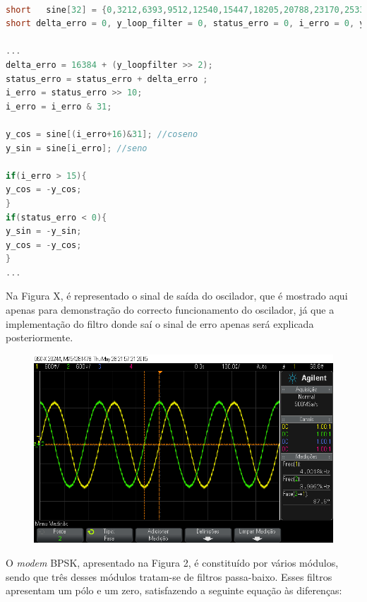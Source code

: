 \documentclass[11pt]{article}
\numberwithin{equation}{section}
\begin{document}
{\begin{lstlisting}[language=C]

short   sine[32] = {0,3212,6393,9512,12540,15447,18205,20788,23170,25330,27246,28899,30274,31357,32138,32610,32767,32610,32138,31357,30274,28899,27246,25330,23170,20788,18205,15447,12540,9512,6393,3212};
short delta_erro = 0, y_loop_filter = 0, status_erro = 0, i_erro = 0, y_cos = 0, y_sin;

...
delta_erro = 16384 + (y_loopfilter >> 2);
status_erro = status_erro + delta_erro ;
i_erro = status_erro >> 10;
i_erro = i_erro & 31;

y_cos = sine[(i_erro+16)&31]; //coseno
y_sin = sine[i_erro]; //seno

if(i_erro > 15){
y_cos = -y_cos;
}
if(status_erro < 0){
y_sin = -y_sin;
y_cos = -y_cos;
}	
...
\end{lstlisting}

Na Figura X, é representado o sinal de saída do oscilador, que é mostrado aqui apenas para demonstração do correcto funcionamento do oscilador, já que a implementação do filtro donde saí o sinal de erro apenas será explicada posteriormente. 

\begin{figure}[H]
	\centering
	\includegraphics[keepaspectratio=true, scale=0.37]{exps/SinVsCos}
	\caption{}
	\vspace{-0.8em}
\end{figure}


O \textit{modem} BPSK, apresentado na Figura 2, é constituído por vários módulos, sendo que três desses módulos tratam-se de filtros passa-baixo. Esses filtros apresentam um pólo e um zero, satisfazendo a seguinte equação às diferenças:

}
\end{document}
